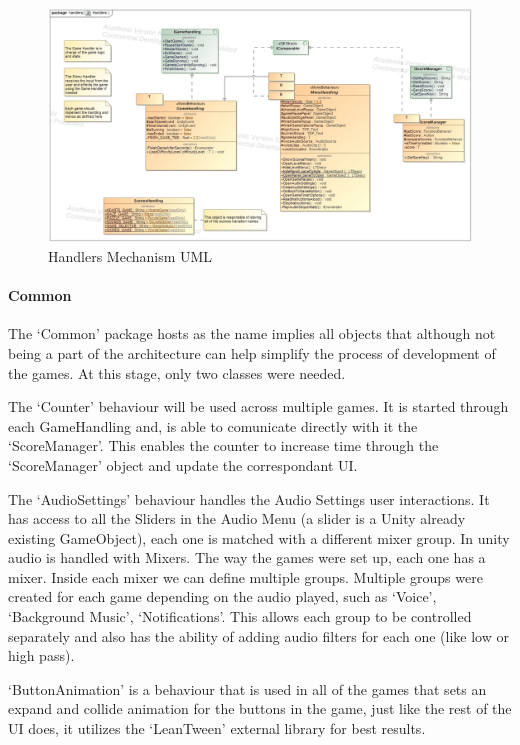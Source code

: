 \begin{figure}[H]
    \centering
    \includegraphics[width=\linewidth]{Chapters/new_architechture/class__handlers__Handlers.jpg}
    \caption{Handlers Mechanism UML}
    \label{fig:handlers}
\end{figure}

\paragraph{Common}

The `Common' package hosts as the name implies all objects that although not being a part of the architecture can help simplify the process of development of the games. At this stage, only two classes were needed. 

The `Counter' behaviour will be used across multiple games. It is started through each GameHandling and, is able to comunicate directly with it the `ScoreManager'. This enables the counter to increase time through the `ScoreManager' object and update the correspondant UI.

The `AudioSettings' behaviour handles the Audio Settings user interactions. It has access to all the Sliders in the Audio Menu (a slider is a Unity already existing GameObject), each one is matched with a different mixer group. In unity audio is handled with Mixers. The way the games were set up, each one has a mixer. Inside each mixer we can define multiple groups. Multiple groups were created for each game depending on the audio played, such as `Voice', `Background Music', `Notifications'. This allows each group to be controlled separately and also has the ability of adding audio filters for each one (like low or high pass).

`ButtonAnimation' is a behaviour that is used in all of the games that sets an expand and collide animation for the buttons in the game, just like the rest of the UI does, it utilizes the `LeanTween' external library for best results.

